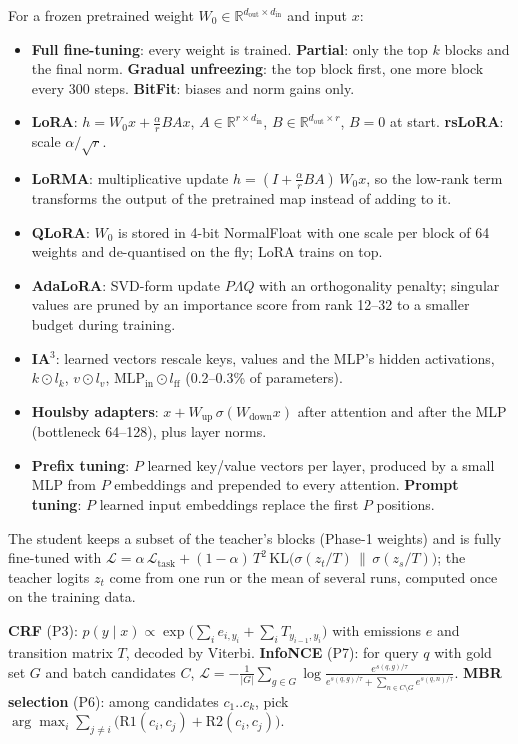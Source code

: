  For a frozen pretrained weight $W_0\in\mathbb{R}^{d_\text{out}\times d_\text{in}}$
and input $x$:
\begin{itemize}[leftmargin=*,itemsep=1pt]
  \item \textbf{Full fine-tuning}: every weight is trained.  \textbf{Partial}: only the top $k$ blocks and the
  final norm.  \textbf{Gradual unfreezing}: the top block first, one more block every 300 steps.
  \textbf{BitFit}: biases and norm gains only.
  \item \textbf{LoRA}: $h=W_0x+\frac{\alpha}{r}BAx$, $A\in\mathbb{R}^{r\times d_\text{in}}$,
  $B\in\mathbb{R}^{d_\text{out}\times r}$, $B=0$ at start.  \textbf{rsLoRA}: scale $\alpha/\sqrt{r}$.
  \item \textbf{LoRMA}: multiplicative update $h=(I+\frac{\alpha}{r}BA)\,W_0x$, so the low-rank term transforms
  the output of the pretrained map instead of adding to it.
  \item \textbf{QLoRA}: $W_0$ is stored in 4-bit NormalFloat with one scale per block of 64 weights and
  de-quantised on the fly; LoRA trains on top.
  \item \textbf{AdaLoRA}: SVD-form update $P\Lambda Q$ with an orthogonality penalty; singular values are pruned
  by an importance score from rank 12--32 to a smaller budget during training.
  \item \textbf{IA$^3$}: learned vectors rescale keys, values and the MLP's hidden activations,
  $k\odot l_k$, $v\odot l_v$, $\mathrm{MLP}_\text{in}\odot l_\text{ff}$ (0.2--0.3\% of parameters).
  \item \textbf{Houlsby adapters}: $x+W_\text{up}\,\sigma(W_\text{down}x)$ after attention and after the MLP
  (bottleneck 64--128), plus layer norms.
  \item \textbf{Prefix tuning}: $P$ learned key/value vectors per layer, produced by a small MLP from $P$
  embeddings and prepended to every attention.  \textbf{Prompt tuning}: $P$ learned input embeddings replace
  the first $P$ positions.
\end{itemize}

 The student keeps a subset of the teacher's blocks (Phase-1 weights) and is
fully fine-tuned with $\mathcal{L}=\alpha\,\mathcal{L}_\text{task}+(1-\alpha)\,T^2\,
\mathrm{KL}\big(\sigma(z_t/T)\,\|\,\sigma(z_s/T)\big)$; the teacher logits $z_t$ come from one run or the mean of
several runs, computed once on the training data.

 \textbf{CRF} (P3): $p(y\mid x)\propto\exp\big(\sum_i
e_{i,y_i}+\sum_i T_{y_{i-1},y_i}\big)$ with emissions $e$ and transition matrix $T$, decoded by Viterbi.
\textbf{InfoNCE} (P7): for query $q$ with gold set $G$ and batch candidates $C$,
$\mathcal{L}=-\frac{1}{|G|}\sum_{g\in G}\log\frac{e^{s(q,g)/\tau}}{e^{s(q,g)/\tau}+\sum_{n\in C\setminus G}e^{s(q,n)/\tau}}$.
\textbf{MBR selection} (P6): among candidates $c_1..c_k$, pick
$\arg\max_i\sum_{j\ne i}\big(\mathrm{R1}(c_i,c_j)+\mathrm{R2}(c_i,c_j)\big)$.

